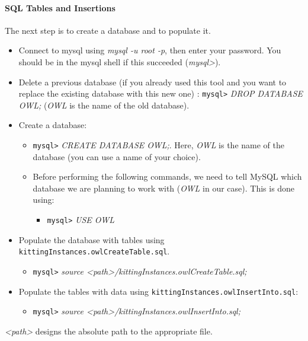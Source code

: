 \paragraph{SQL Tables and Insertions}
The next step is to create a database and to populate it.

\begin{itemize}
\item Connect to mysql using \textit{mysql -u root -p}, then enter your password. You should be in the mysql shell if this succeeded (\textit{mysql>}).
\item Delete a previous database (if you already used this tool and you want to replace the existing database with this new one) :
\texttt{mysql>} \textit{DROP DATABASE OWL;} (\textit{OWL} is the name of the old database).
\item Create a database:
\begin{itemize}
\item \texttt{mysql>} \textit{CREATE DATABASE OWL;}. Here, \textit{OWL} is the name of the database (you can use a name of your choice).
\item Before performing the following commands, we need to tell MySQL which database we are planning to work with (\textit{OWL} in our case). This is done using:
\begin{itemize}
\item[] \texttt{mysql>} \textit{USE OWL}
\end{itemize}
\end{itemize}
\item Populate the database with tables using \texttt{kittingInstances.owlCreateTable.sql}.
\begin{itemize}
 \item \texttt{mysql>} \textit{source <path>/kittingInstances.owlCreateTable.sql;}
\end{itemize}

\item Populate the tables with data using \texttt{kittingInstances.owlInsertInto.sql}:
\begin{itemize}
 \item \texttt{mysql>} \textit{source <path>/kittingInstances.owlInsertInto.sql;}
\end{itemize}
\end{itemize}

\textit{<path>} designs the absolute path to the appropriate file.


